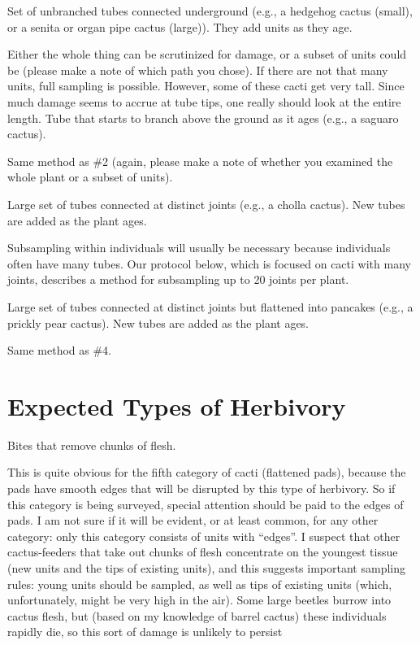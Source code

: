 \documentclass[
  letterpaper,
  DIV=11,
  numbers=noendperiod]{scrreprt}
\begin{document}
Set of unbranched tubes connected underground (e.g., a hedgehog cactus
(small), or a senita or organ pipe cactus (large)). They add units as
they age.

Either the whole thing can be scrutinized for damage, or a subset of
units could be (please make a note of which path you chose). If there
are not that many units, full sampling is possible. However, some of
these cacti get very tall. Since much damage seems to accrue at tube
tips, one really should look at the entire length. Tube that starts to
branch above the ground as it ages (e.g., a saguaro cactus).

Same method as \#2 (again, please make a note of whether you examined
the whole plant or a subset of units).

Large set of tubes connected at distinct joints (e.g., a cholla cactus).
New tubes are added as the plant ages.

Subsampling within individuals will usually be necessary because
individuals often have many tubes. Our protocol below, which is focused
on cacti with many joints, describes a method for subsampling up to 20
joints per plant.

Large set of tubes connected at distinct joints but flattened into
pancakes (e.g., a prickly pear cactus). New tubes are added as the plant
ages.

Same method as \#4.

\section{Expected Types of Herbivory}\label{expected-types-of-herbivory}

Bites that remove chunks of flesh.

This is quite obvious for the fifth category of cacti (flattened pads),
because the pads have smooth edges that will be disrupted by this type
of herbivory. So if this category is being surveyed, special attention
should be paid to the edges of pads. I am not sure if it will be
evident, or at least common, for any other category: only this category
consists of units with ``edges''. I suspect that other cactus-feeders
that take out chunks of flesh concentrate on the youngest tissue (new
units and the tips of existing units), and this suggests important
sampling rules: young units should be sampled, as well as tips of
existing units (which, unfortunately, might be very high in the air).
Some large beetles burrow into cactus flesh, but (based on my knowledge
of barrel cactus) these individuals rapidly die, so this sort of damage
is unlikely to persist
\end{document}
